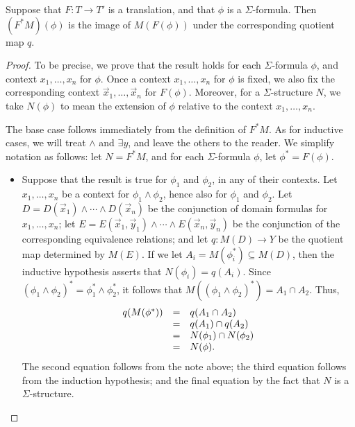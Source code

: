 \begin{prop} Suppose that $F:T\to T'$ is a translation, and that
  $\phi$ is a $\Sigma$-formula.  Then $(F^*M)(\phi )$ is the image of
  $M(F(\phi ))$ under the corresponding quotient map $q$. \end{prop}

\begin{proof} To be precise, we prove that the result holds for each
  $\Sigma$-formula $\phi$, and context $x_1,\dots ,x_n$ for $\phi$.
  Once a context $x_1,\dots ,x_n$ for $\phi$ is fixed, we also fix the
  corresponding context $\vec{x}_1,\dots ,\vec{x}_n$ for $F(\phi )$.
  Moreover, for a $\Sigma$-structure $N$, we take $N(\phi )$ to
  mean the extension of $\phi$ relative to the context
  $x_1,\dots ,x_n$.
  
  The base case follows immediately from the definition of $F^*M$.  As
  for inductive cases, we will treat $\wedge$ and $\exists y$, and
  leave the others to the reader.  We simplify notation as follows:
  let $N=F^*M$, and for each $\Sigma$-formula $\phi$, let
  $\phi ^*=F(\phi )$.  \begin{itemize}
  \item Suppose that the result is true for $\phi _1$ and $\phi _2$,
    in any of their contexts.  Let $x_1,\dots ,x_n$ be a context for
    $\phi _1\wedge\phi _2$, hence also for $\phi _1$ and $\phi _2$.
    Let $D=D(\vec{x}_1)\wedge\cdots\wedge D(\vec{x}_n)$ be the
    conjunction of domain formulas for $x_1,\dots ,x_n$; let
    $E=E(\vec{x}_1,\vec{y}_1)\wedge\cdots\wedge
    E(\vec{x}_n,\vec{y}_n)$ be the conjunction of the corresponding
    equivalence relations; and let $q:M(D)\to Y$ be the quotient map
    determined by $M(E)$.  If we let $A_i=M(\phi _i^*)\subseteq M(D)$,
    then the inductive hypothesis asserts that $N(\phi _i)=q(A_i)$.
    Since $(\phi _1\wedge \phi _2)^*=\phi _1^*\wedge \phi _2^*$, it
    follows that $M((\phi _1\wedge\phi _2)^*)=A_1\cap A_2$.  Thus,
    \[ \begin{array}{l l l} q(M(\phi ^*)) & =& q(A_1\cap A_2) \\
      &= & q(A_1)\cap q(A_2) \\
      & = & N(\phi _1)\cap N(\phi _2) \\
      & = & N(\phi ) .\end{array} \]
The second equation follows from the note above; the third equation
follows from the induction hypothesis; and the final equation  by the fact that
$N$ is a $\Sigma$-structure.  


\end{itemize}
\end{proof}
